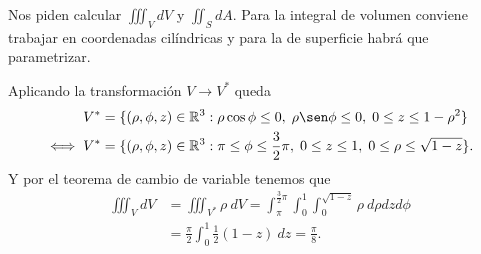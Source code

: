 \begin{solution}
    Nos piden calcular $\iiint_V dV$ y $\iint_S dA$. Para la
    integral de volumen conviene trabajar en coordenadas
    cil\'indricas y para la de superficie habr\'a que parametrizar.

    \begin{center}
      \end{center}

    Aplicando la transformaci\'on $V \rightarrow V^*$ queda
    \begin{align*}
        V^*      & =\{(\rho, \phi, z)\in\Re^3: \rho\cos\phi \leq 0,\;
        \rho\sen\phi \leq 0,\; 0 \leq z \leq 1-\rho^2\}               \\
        \iff V^* & =\{(\rho, \phi, z)\in\Re^3: \pi \leq \phi \leq
        \frac{3}{2}\pi,\; 0 \leq z \leq 1,\; 0 \leq \rho \leq
        \sqrt{1-z} \}.
    \end{align*}
    Y por el teorema de cambio de variable tenemos que
    \begin{align*}
        \iiint_V dV & = \iiint_{V^*} \rho\:dV = \int_\pi^{\frac{3}{2}\pi}
        \int_0^1\int_0^{\sqrt{1-z}}\rho\:d\rho dz d\phi                   \\
                    & =\frac{\pi}{2}\int_0^1\frac{1}{2}(1-z)\:dz =
        \frac{\pi}{8}.
    \end{align*}


\end{solution}
